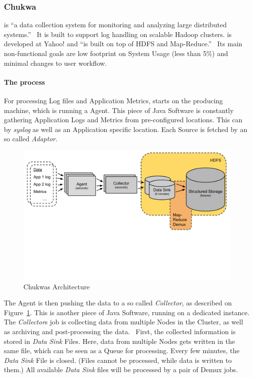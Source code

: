 \subsubsection{Chukwa}
\chuklong is ``a data collection system for monitoring and analyzing large distributed systems.''~\cite{Boulona}
It is built to support log handling on scalable Hadoop clusters. \chuk is developed at Yahoo! and ``is built on top of HDFS and Map-Reduce.''~\cite{Rabkin2008a}
Its main non-functional goals are low footprint on System Usage (less than 5\%) and minimal changes to user workflow.~\cite{Rabkin2010}

\paragraph{The process}
For processing Log files and Application Metrics, \chuk starts on the producing machine, which is running a \chuk Agent. 
This piece of Java Software is constantly gathering Application Logs and Metrics from pre-configured locations. 
This can by \textit{syslog} as well as an Application specific location. 
Each Source is fetched by an so called \textit{Adaptor}.~\cite{ChukwaAdminAgent}

\begin{figure}[hbt]
  \centering
  \includegraphics[width=\linewidth,clip=true,trim=0 6cm 0 0]{images/ChukwaArchitecture}
  \caption{Chukwas Architecture~\cite{Rabkin2008}}
  \label{fig:ChukwaArchitecture}
\end{figure}

The Agent is then pushing the data to a so called \textit{Collector}, as described on Figure~\ref{fig:ChukwaArchitecture}.
This is another piece of Java Software, running on a dedicated \chuk instance. 
The \textit{Collector}s job is collecting data from multiple Nodes in the Cluster, as well as archiving and post-processing the data.~\cite{Jose2014}
First, the collected information is stored in \textit{Data Sink} Files. 
Here, data from multiple Nodes gets written in the same file, which can be seen as a Queue for processing.
Every few minutes, the \textit{Data Sink} File is closed. (Files cannot be processed, while data is written to them.)
All available \textit{Data Sink} files will be processed by a pair of Demux \mr jobs.~\cite{Boulona} 


